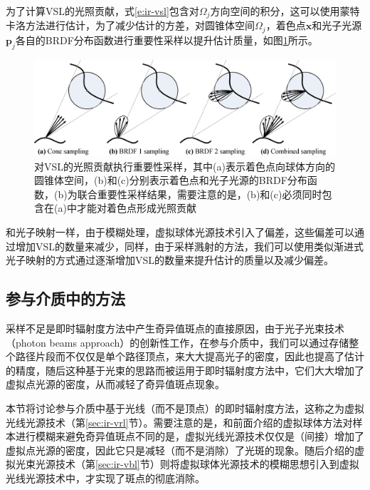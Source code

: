 为了计算VSL的光照贡献，式\ref{e:ir-vsl}包含对$\Omega_j$方向空间的积分，这可以使用蒙特卡洛方法进行估计，为了减少估计的方差，\cite{a:VirtualSphericalLightsforMany-LightRenderingofGlossyScenes}对圆锥体空间$\Omega_j$，着色点$\mathbf{x}$和光子光源$\mathbf{p}_j$各自的BRDF分布函数进行重要性采样以提升估计质量，如图\ref{f:ir-vsl-sampling}所示。

\begin{figure}
	\includegraphics[width=1.0\textwidth]{figures/ir/vsl-sampling}
	\caption{对VSL的光照贡献执行重要性采样，其中(a)表示着色点向球体方向的圆锥体空间，(b)和(c)分别表示着色点和光子光源的BRDF分布函数，(b)为联合重要性采样结果，需要注意的是，(b)和(c)必须同时包含在(a)中才能对着色点形成光照贡献}
	\label{f:ir-vsl-sampling}
\end{figure}

和光子映射一样，由于模糊处理，虚拟球体光源技术引入了偏差，这些偏差可以通过增加VSL的数量来减少，同样，由于采样溅射的方法，我们可以使用类似渐进式光子映射的方式通过逐渐增加VSL的数量来提升估计的质量以及减少偏差。




\subsection{参与介质中的方法}
采样不足是即时辐射度方法中产生奇异值斑点的直接原因，由于光子光束技术（photon beams approach）\cite{a:AComprehensiveTheoryofVolumetricRadianceEstimationusingPhotonPointsandBeams,a:ProgressivePhotonBeams}的创新性工作，在参与介质中，我们可以通过存储整个路径片段而不仅仅是单个路径顶点，来大大提高光子的密度，因此也提高了估计的精度，随后这种基于光束的思路而被运用于即时辐射度方法中，它们大大增加了虚拟点光源的密度，从而减轻了奇异值斑点现象。

本节将讨论参与介质中基于光线（而不是顶点）的即时辐射度方法，这称之为虚拟光线光源技术（第\ref{sec:ir-vrl}节）。需要注意的是，和前面介绍的虚拟球体方法对样本进行模糊来避免奇异值斑点不同的是，虚拟光线光源技术仅仅是（间接）增加了虚拟点光源的密度，因此它只是减轻（而不是消除）了光斑的现象。随后介绍的虚拟光束光源技术（第\ref{sec:ir-vbl}节）则将虚拟球体光源技术的模糊思想引入到虚拟光线光源技术中，才实现了斑点的彻底消除。





